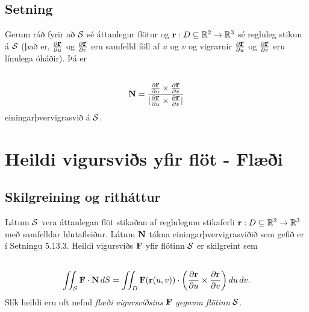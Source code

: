 \documentclass[a4paper,10pt,icelandic]{sphinxmanual}
\begin{document}
\subsection{Setning}
\label{Kafli5:id25}
Gerum ráð fyrir að \(\cal S\) sé áttanlegur flötur og
\(\mbox{${\bf r}$}:D\subseteq{\mathbb  R}^2\rightarrow {\mathbb  R}^3\)
sé regluleg stikun á \(\cal S\) (það er,
\(\frac{\partial \mbox{${\bf r}$}}{\partial u}\) og
\(\frac{\partial \mbox{${\bf r}$}}{\partial v}\) eru samfelld föll
af \(u\) og \(v\) og vigrarnir
\(\frac{\partial \mbox{${\bf r}$}}{\partial u}\) og
\(\frac{\partial \mbox{${\bf r}$}}{\partial v}\) eru línulega
óháðir). Þá er
\begin{gather}
\begin{split}\displaystyle\end{split}\notag\\\begin{split}\mbox{${\bf N}$}=
\frac{\frac{\partial \mbox{${\bf r}$}}{\partial u}\times\frac{\partial
    \mbox{${\bf r}$}}{\partial v}}
{|\frac{\partial \mbox{${\bf r}$}}{\partial u}\times\frac{\partial
    \mbox{${\bf r}$}}{\partial v}|}\end{split}\notag
\end{gather}
einingarþvervigrasvið á \(\cal S\).


\section{Heildi vigursviðs yfir flöt - Flæði}
\label{Kafli5:heildi-vigursvis-yfir-flot-flaei}

\subsection{Skilgreining og ritháttur}
\label{Kafli5:skilgreining-og-rithattur}
Látum \(\cal S\) vera áttanlegan flöt stikaðan af reglulegum
stikaferli
\(\mbox{${\bf r}$}:D\subseteq{\mathbb  R}^2\rightarrow {\mathbb  R}^3\)
með samfelldar hlutafleiður. Látum \(\mbox{${\bf N}$}\) tákna
einingarþvervigrasviðið sem gefið er í Setningu 5.13.3. Heildi vigursviðs
\(\mbox{${\bf F}$}\) yfir flötinn \(\cal S\) er skilgreint sem
\begin{gather}
\begin{split}\displaystyle\end{split}\notag\\\begin{split}\int\!\!\!\int_{\cal S} \mbox{${\bf F}$}\cdot\mbox{${\bf N}$}\,dS
=\int\!\!\!\int_D \mbox{${\bf F}$}(\mbox{${\bf r}$}(u,v))\cdot \bigg(
\frac{\partial \mbox{${\bf r}$}}{\partial u}\times\frac{\partial \mbox{${\bf r}$}}{\partial
  v}\bigg)\,
du\,dv.\end{split}\notag
\end{gather}
Slík heildi eru oft nefnd \emph{flæði vigursviðsins} \(\mbox{${\bf F}$}\)
\emph{gegnum flötinn} \(\cal S\).
\end{document}

